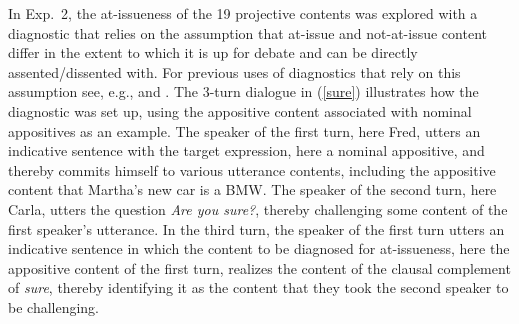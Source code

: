 \documentclass[11pt,fleqn]{article}
\newcommand{\6}{\mbox{$[\hspace*{-.6mm}[$}}
\newcommand{\9}{\mbox{$]\hspace*{-.6mm}]$}}
\begin{document}
In Exp.~2, the at-issueness of the 19 projective contents was explored with a diagnostic that relies on the assumption that at-issue and not-at-issue content differ in the extent to which it is up for debate and can be directly assented/dissented with. For previous uses of diagnostics that rely on this assumption see, e.g., \citealt{amaral-etal07,xue-onea11,murray2014,anderbois-etal2015,destruel-etal2015,tonhauser-sula6} and \citealt{syrett-koev2015}. The 3-turn dialogue in (\ref{sure}) illustrates how the diagnostic was set up, using the appositive content associated with nominal appositives as an example. The speaker of the first turn, here Fred, utters an indicative sentence with the target expression, here a nominal appositive, and thereby commits himself to various utterance contents, including the appositive content that Martha's new car is a BMW. The speaker of the second turn, here Carla, utters the question {\em Are you sure?}, thereby challenging some content of the first speaker's utterance. In the third turn, the speaker of the first turn utters an indicative sentence in which the content to be diagnosed for at-issueness, here the appositive content of the first turn, realizes the content of the clausal complement of {\em sure}, thereby identifying it as the content that they took the second speaker to be challenging. 
\end{document}
